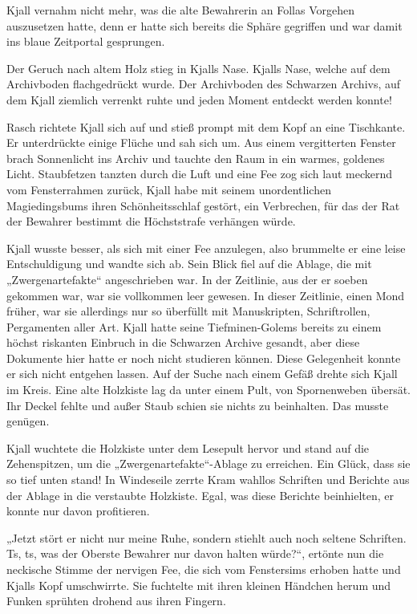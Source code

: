 \documentclass[10pt, a4paper, oneside]{book}
\begin{document}
Kjall vernahm nicht mehr, was die alte Bewahrerin an Follas Vorgehen auszusetzen hatte, denn er hatte sich bereits die Sphäre gegriffen und war damit ins blaue Zeitportal gesprungen.\bigskip



Der Geruch nach altem Holz stieg in Kjalls Nase. Kjalls Nase, welche auf dem Archivboden flachgedrückt wurde. Der Archivboden des Schwarzen Archivs, auf dem Kjall ziemlich verrenkt ruhte und jeden Moment entdeckt werden konnte!

Rasch richtete Kjall sich auf und stieß prompt mit dem Kopf an eine Tischkante. Er unterdrückte einige Flüche und sah sich um. Aus einem vergitterten Fenster brach Sonnenlicht ins Archiv und tauchte den Raum in ein warmes, goldenes Licht. Staubfetzen tanzten durch die Luft und eine Fee zog sich laut meckernd vom Fensterrahmen zurück, Kjall habe mit seinem unordentlichen Magiedingsbums ihren Schönheitsschlaf gestört, ein Verbrechen, für das der Rat der Bewahrer bestimmt die Höchststrafe verhängen würde.

Kjall wusste besser, als sich mit einer Fee anzulegen, also brummelte er eine leise Entschuldigung und wandte sich ab. Sein Blick fiel auf die Ablage, die mit „Zwergenartefakte“ angeschrieben war. In der Zeitlinie, aus der er soeben gekommen war, war sie vollkommen leer gewesen. In dieser Zeitlinie, einen Mond früher, war sie allerdings nur so überfüllt mit Manuskripten, Schriftrollen, Pergamenten aller Art. Kjall hatte seine Tiefminen-Golems bereits zu einem höchst riskanten Einbruch in die Schwarzen Archive gesandt, aber diese Dokumente hier hatte er noch nicht studieren können. Diese Gelegenheit konnte er sich nicht entgehen lassen. Auf der Suche nach einem Gefäß drehte sich Kjall im Kreis. Eine alte Holzkiste lag da unter einem Pult, von Spornenweben übersät. Ihr Deckel fehlte und außer Staub schien sie nichts zu beinhalten. Das musste genügen.

Kjall wuchtete die Holzkiste unter dem Lesepult hervor und stand auf die Zehenspitzen, um die „Zwergenartefakte“-Ablage zu erreichen. Ein Glück, dass sie so tief unten stand! In Windeseile zerrte Kram wahllos Schriften und Berichte aus der Ablage in die verstaubte Holzkiste. Egal, was diese Berichte beinhielten, er konnte nur davon profitieren.

„Jetzt stört er nicht nur meine Ruhe, sondern stiehlt auch noch seltene Schriften. Ts, ts, was der Oberste Bewahrer nur davon halten würde?“, ertönte nun die neckische Stimme der nervigen Fee, die sich vom Fenstersims erhoben hatte und Kjalls Kopf umschwirrte. Sie fuchtelte mit ihren kleinen Händchen herum und Funken sprühten drohend aus ihren Fingern.
\end{document}
